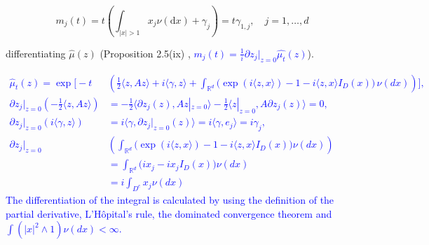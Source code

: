 \documentclass[a4paper,11pt]{article}
\begin{document}
\begin{equation*}
    m_{j}(t)=t\left(\int_{|x|>1} x_{j} \nu(\mathrm{d} x)+\gamma_{j}\right)=t \gamma_{1, j}, \quad j=1, \ldots, d \tag{25.7}
\end{equation*}

differentiating $\widehat{\mu}(z)$ (Proposition 2.5(ix) , \textcolor{blue}{$m_{j}(t) = \frac{1}{i} \partial z_{j}|_{z=0} \widehat{\mu_{t}}(z)$}).

\textcolor{blue}{
\small
\begin{align*}
    \widehat{\mu}_{t}(z)                                                      =
    \operatorname{e x p} \biggl[-t                                           & \left(\frac{1} {2} \langle z, A z \rangle +i \langle\gamma, z \rangle+\int_{\mathbb{R}^{d}} \bigl( \operatorname{e x p} ( i \langle z, x \rangle)-1-i \langle z, x \rangle I_{D} ( x ) \bigr) \, \nu( d x )\right) \biggr], \\
    \partial z_{j}|_{z=0}\left( -\frac{1} {2} \langle z, A z \rangle \right) & =
    -\frac{1} {2} \langle \partial z_{j}(z), A z|_{z=0} \rangle
    -\frac{1} {2} \langle z|_{z=0}, A \partial z_{j}(z) \rangle=0,                                                                                                                                                                                                                                         \\
    \partial z_{j}|_{z=0}\left( i \langle \gamma, z \rangle \right)          & = i \langle\gamma, \partial z_{j}|_{z=0}(z) \rangle =
    i \langle\gamma, e_{j}  \rangle = i \gamma_{j}                           ,                                                                                                                                                                                                                             \\
    \partial z_{j}|_{z=0}                                                    & \left( \int_{\mathbb{R}^{d}}                         \bigl( \operatorname{e x p} ( i \langle z, x \rangle)-1-i \langle z, x \rangle I_{D} ( x ) \bigr) \nu(dx) \right)                                                      \\
                                                                             & = \int_{\mathbb{R}^{d}}                         \bigl( ix_{j}-i x_{j}I_{D} ( x ) \bigr) \nu(dx)                                                                                                                             \\
                                                                             & = i\int_{D^{c}} x_{j} \nu(dx)
\end{align*}
The differentiation of the integral is calculated by using the definition of the partial derivative, L'H\^{o}pital's rule, the dominated convergence theorem and $\int(|x|^{2} \wedge 1 ) \nu(dx) < \infty $.
}
\end{document}
